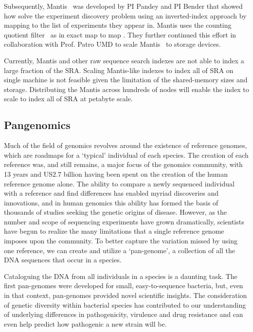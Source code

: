 Subsequently, Mantis~\cite{PandeyABFJP18Cell} was developed by PI Pandey and PI Bender that showed how solve the experiment discovery problem using an inverted-index approach by mapping \kmers to the list of experiments they appear in. Mantis uses the counting quotient filter~\cite{PandeyBJP17} as in exact map to map \kmers. They further continued this effort in collaboration with Prof. Patro UMD to scale Mantis~\cite{AlmodaresiPFJP19,AlmodaresiPFJP20} to storage devices. 


\begin{rproblem}
Currently, Mantis and other raw sequence search indexes are not able to index a large fraction of the SRA. Scaling Mantis-like indexes to index all of SRA on single machine is not feasible given the limitation of the shared-memory sizes and storage. Distributing the Mantis across hundreds of nodes will enable the index to scale to index all of SRA at petabyte scale.
\label{rprob:peppermint}
\end{rproblem}

\subsection{Pangenomics}

Much of the field of genomics revolves around the existence of reference genomes, which are roadmaps for a ‘typical’ individual of each species. The creation of each reference was, and still remains, a major focus of the genomics community, with 13 years and US$2.7$ billion having been spent on the creation of the human reference genome alone. The ability to compare a newly sequenced individual with a reference and find differences has enabled myriad discoveries and innovations, and in human genomics this ability has formed the basis of thousands of studies seeking the genetic origins of disease. However, as the number and scope of sequencing experiments have grown dramatically, scientists have begun to realize the many limitations that a single reference genome imposes upon the community. To better capture the variation missed by using one reference, we can create and utilize a ‘pan-genome’, a collection of all the DNA sequences that occur in a species.

Cataloguing the DNA from all individuals in a species is a daunting task. The first pan-genomes were developed for small, easy-to-sequence bacteria, but, even in that context, pan-genomes provided novel scientific insights. The consideration of genetic diversity within bacterial species has contributed to our understanding of underlying differences in pathogenicity, virulence and drug resistance and can even help predict how pathogenic a new strain will be.

